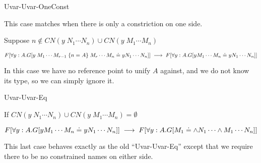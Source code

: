 \begin{tcase}
Uvar-Uvar-OneConst
\end{tcase}

This case matches when there is only a constriction on one side.

Suppose $n\notin CN(y \; N_1 \cdots N_n) \cup CN(y \; M_1 \cdots M_n)$

\[
F[\forall y : A . G[y \; M_1 \cdots M_{r-1} \;\{ n = A \} \; M_{r} \cdots M_n \doteq y N_1 \cdots N_n  ]]
\;\longrightarrow\;
F[\forall y : A . G[y M_1 \cdots M_n \doteq y N_1 \cdots N_n ]]
\]

In this case we have no reference point to unify $A$ against, and we do not know its type, so we can simply ignore it. 

\begin{tcase}
Uvar-Uvar-Eq
\end{tcase}

If $CN(y \; N_1 \cdots N_n) \cup CN(y \; M_1 \cdots M_n) = \emptyset$

\[
F[\forall y : A . G[y M_1 \cdots M_n \doteq y N_1 \cdots N_n  ]]
\;\longrightarrow\;
F[\forall y : A . G[ M_1 \doteq \wedge N_1 \cdots \wedge M_1 \cdots N_n ]]
\]

This last case behaves exactly as the old ``Uvar-Uvar-Eq'' except that we require there to be no constrained names on either side.
